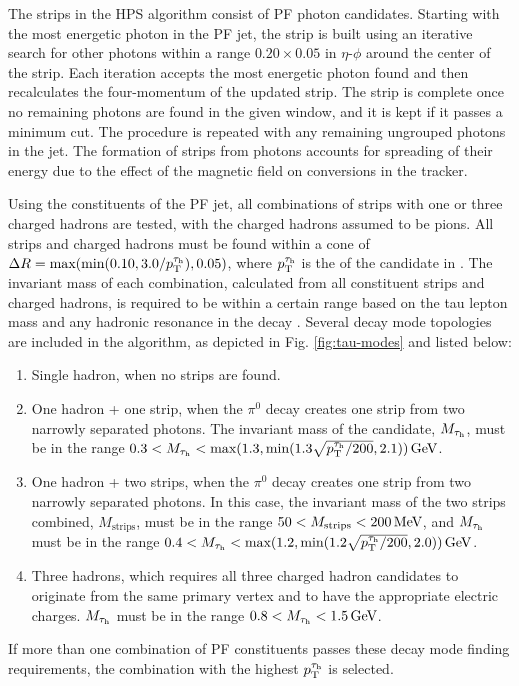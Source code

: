 The strips in the HPS algorithm consist of PF photon candidates. Starting with the most energetic photon in the PF jet, the strip is built using an iterative search for other photons within a range $0.20\times0.05$ in $\eta$-$\phi$ around the center of the strip. Each iteration accepts the most energetic photon found and then recalculates the four-momentum of the updated strip. The strip is complete once no remaining photons are found in the given window, and it is kept if it passes a minimum \pt cut. The procedure is repeated with any remaining ungrouped photons in the jet. The formation of strips from photons accounts for spreading of their energy due to the effect of the magnetic field on conversions in the tracker.

Using the constituents of the PF jet, all combinations of strips with one or three charged hadrons are tested, with the charged hadrons assumed to be pions. All strips and charged hadrons must be found within a cone of $\Delta R = \text{max}(\text{min}(0.10,3.0/p_{\mathrm{T}}^{\tau_{\text{h}}}),0.05)$, where $p_{\mathrm{T}}^{\tau_{\text{h}}}$ is the \pt of the \tauh candidate in \GeVns. The invariant mass of each combination, calculated from all constituent strips and charged hadrons, is required to be within a certain range based on the tau lepton mass and any hadronic resonance in the decay \cite{CMS-AN-2014-008}. Several decay mode topologies are included in the algorithm, as depicted in Fig. \ref{fig:tau-modes} and listed below:
\begin{enumerate}
\item Single hadron, when no strips are found.
\item One hadron + one strip, when the $\pi^0$ decay creates one strip from two narrowly separated photons. The invariant mass of the \tauh candidate, $M_{\tau_{\text{h}}}$, must be in the range $0.3 < M_{\tau_{\text{h}}} < \text{max}(1.3,\text{min}(1.3\sqrt{p_{\mathrm{T}}^{\tau_{\text{h}}}/200},2.1))\,\text{Ge\hspace{-.08em}V}$.
\item One hadron + two strips, when the $\pi^0$ decay creates one strip from two narrowly separated photons. In this case, the invariant mass of the two strips combined, $M_{\text{strips}}$, must be in the range $50 < M_{\text{strips}} < 200\,\text{Me\hspace{-.08em}V}$, and $M_{\tau_{\text{h}}}$ must be in the range $0.4 < M_{\tau_{\text{h}}} < \text{max}(1.2,\text{min}(1.2\sqrt{p_{\mathrm{T}}^{\tau_{\text{h}}}/200},2.0))\,\text{Ge\hspace{-.08em}V}$.
\item Three hadrons, which requires all three charged hadron candidates to originate from the same primary vertex and to have the appropriate electric charges. $M_{\tau_{\text{h}}}$ must be in the range $0.8 < M_{\tau_{\text{h}}} < 1.5\,\text{Ge\hspace{-.08em}V}$.
\end{enumerate}
If more than one combination of PF constituents passes these decay mode finding requirements, the combination with the highest $p_{\mathrm{T}}^{\tau_{\text{h}}}$ is selected.

